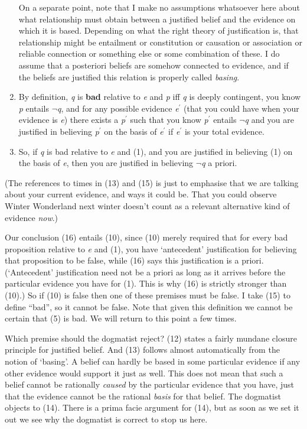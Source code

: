 \begin{enumerate}
{    On a separate point, note that I make no assumptions whatsoever here
    about what relationship must obtain between a justified belief and
    the evidence on which it is based. Depending on what the right
    theory of justification is, that relationship might be entailment or
    constitution or causation or association or reliable connection or
    something else or some combination of these. I do assume that a
    posteriori beliefs are somehow connected to evidence, and if the
    beliefs are justified this relation is properly called
    \emph{basing}.}
\item
  By definition, \emph{q} is \textbf{bad} relative to \emph{e} and
  \emph{p} iff \emph{q} is deeply contingent, you know \emph{p} entails
  \(\neg\)\emph{q}, and for any possible evidence \emph{e}\(^\prime\)
  (that you could have when your evidence is \emph{e}) there exists a
  \emph{p}\(^\prime\) such that you know \emph{p}\(^\prime\) entails
  \(\neg\)\emph{q} and you are justified in believing
  \emph{p}\(^\prime\) on the basis of \emph{e}\(^\prime\) if
  \emph{e}\(^\prime\) is your total evidence.
\item
  So, if \emph{q} is bad relative to \emph{e} and (1), and you are
  justified in believing (1) on the basis of \emph{e}, then you are
  justified in believing \(\neg\)\emph{q} a priori.
\end{enumerate}

(The references to times in (13) and (15) is just to emphasise that we
are talking about your current evidence, and ways it could be. That you
could observe Winter Wonderland next winter doesn't count as a relevant
alternative kind of evidence \emph{now}.)

Our conclusion (16) entails (10), since (10) merely required that for
every bad proposition relative to \emph{e} and (1), you have
`antecedent' justification for believing that proposition to be false,
while (16) says this justification is a priori. (`Antecedent'
justification need not be a priori as long as it arrives before the
particular evidence you have for (1). This is why (16) is strictly
stronger than (10).) So if (10) is false then one of these premises must
be false. I take (15) to define ``bad'', so it cannot be false. Note
that given this definition we cannot be certain that (5) is bad. We will
return to this point a few times.

Which premise should the dogmatist reject?{ }(12) states a fairly
mundane closure principle for justified belief. And (13) follows almost
automatically from the notion of `basing'. A belief can hardly be based
in some particular evidence if any other evidence would support it just
as well. This does not mean that such a belief cannot be rationally
\emph{caused} by the particular evidence that you have, just that the
evidence cannot be the rational \emph{basis} for that belief. The
dogmatist objects to (14). There is a prima facie argument for (14), but
as soon as we set it out we see why the dogmatist is correct to stop us
here.

